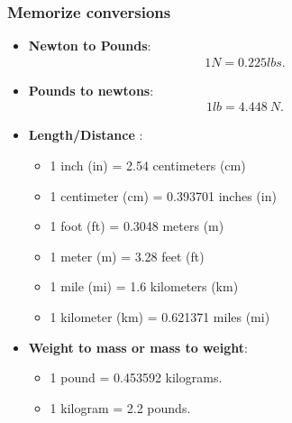 \documentclass{report}
\begin{document}
    \pagebreak 
    \subsubsection{Memorize conversions}
    \begin{itemize}
        \item \textbf{Newton to Pounds}: 
            \begin{align*}
                1N = 0.225lbs
            .\end{align*}
        \item \textbf{Pounds to newtons}:
            \begin{align*}
                1lb = 4.448\ N
            .\end{align*}
        \item \textbf{Length/Distance }:
            \begin{itemize}
                \item 1 inch (in) = 2.54 centimeters (cm)
                \item 1 centimeter (cm) = 0.393701 inches (in)
                \item 1 foot (ft) = 0.3048 meters (m)
                \item 1 meter (m) = 3.28 feet (ft)
                \item 1 mile (mi) = 1.6 kilometers (km)
                \item 1 kilometer (km) = 0.621371 miles (mi)
            \end{itemize}
    \item \textbf{Weight to mass or mass to weight}:
        \begin{itemize}
            \item 1 pound = 0.453592 kilograms.
            \item 1 kilogram = 2.2 pounds.
        \end{itemize}
    \end{itemize}



    \pagebreak 
\end{document}
